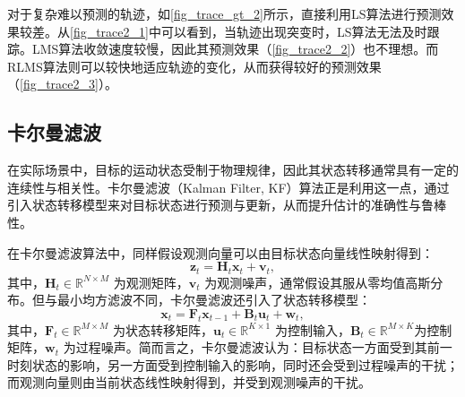 \begin{solution}
    对于复杂难以预测的轨迹，如\cref{fig_trace_gt_2}所示，直接利用LS算法进行预测效果较差。从\cref{fig_trace2_1}中可以看到，当轨迹出现突变时，LS算法无法及时跟踪。LMS算法收敛速度较慢，因此其预测效果（\cref{fig_trace2_2}）也不理想。而RLMS算法则可以较快地适应轨迹的变化，从而获得较好的预测效果（\cref{fig_trace2_3}）。
\end{solution}

\subsection{卡尔曼滤波}
在实际场景中，目标的运动状态受制于物理规律，因此其状态转移通常具有一定的连续性与相关性。卡尔曼滤波（Kalman Filter, KF）算法正是利用这一点，通过引入状态转移模型来对目标状态进行预测与更新，从而提升估计的准确性与鲁棒性。

在卡尔曼滤波算法中，同样假设观测向量可以由目标状态向量线性映射得到：
\[
    \bm{z}_t = \mathbf{H}_t \bm{x}_t + \bm{v}_t,
\]
其中，$\mathbf{H}_t \in \mathbb{R}^{N \times M}$ 为观测矩阵，\( \bm{v}_t \) 为观测噪声，通常假设其服从零均值高斯分布。但与最小均方滤波不同，卡尔曼滤波还引入了状态转移模型：
\[
    \bm{x}_t = \mathbf{F}_t \bm{x}_{t-1} + \mathbf{B}_t  \bm{u}_t + \bm{w}_t,
\]
其中，$\mathbf{F}_t \in \mathbb{R}^{M \times M}$ 为状态转移矩阵，\( \bm{u}_t \in \mathbb{R}^{K \times 1} \) 为控制输入，\( \mathbf{B}_t \in \mathbb{R}^{M \times K} \)为控制矩阵，$\bm{w}_t$ 为过程噪声。简而言之，卡尔曼滤波认为：目标状态一方面受到其前一时刻状态的影响，另一方面受到控制输入的影响，同时还会受到过程噪声的干扰；而观测向量则由当前状态线性映射得到，并受到观测噪声的干扰。

